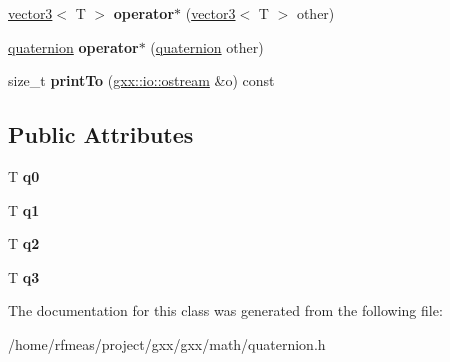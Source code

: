 \begin{DoxyCompactItemize}
\item 
\hyperlink{structmalgo_1_1vector3}{vector3}$<$ T $>$ {\bfseries operator$\ast$} (\hyperlink{structmalgo_1_1vector3}{vector3}$<$ T $>$ other)\hypertarget{classmalgo_1_1quaternion_ae8b0a1cc59760b468b5171b75cb685a4}{}\label{classmalgo_1_1quaternion_ae8b0a1cc59760b468b5171b75cb685a4}

\item 
\hyperlink{classmalgo_1_1quaternion}{quaternion} {\bfseries operator$\ast$} (\hyperlink{classmalgo_1_1quaternion}{quaternion} other)\hypertarget{classmalgo_1_1quaternion_aa78f115e5b771807299addb4657c0240}{}\label{classmalgo_1_1quaternion_aa78f115e5b771807299addb4657c0240}

\item 
size\+\_\+t {\bfseries print\+To} (\hyperlink{classgxx_1_1io_1_1ostream}{gxx\+::io\+::ostream} \&o) const \hypertarget{classmalgo_1_1quaternion_adafd686e46cd5c22d7778104fed7992d}{}\label{classmalgo_1_1quaternion_adafd686e46cd5c22d7778104fed7992d}

\end{DoxyCompactItemize}
\subsection*{Public Attributes}
\begin{DoxyCompactItemize}
\item 
T {\bfseries q0}\hypertarget{classmalgo_1_1quaternion_acc1d88a72d47b816149f1b54ab8c4889}{}\label{classmalgo_1_1quaternion_acc1d88a72d47b816149f1b54ab8c4889}

\item 
T {\bfseries q1}\hypertarget{classmalgo_1_1quaternion_abe1e014de94a7ad1f8e243a9a76b1c0c}{}\label{classmalgo_1_1quaternion_abe1e014de94a7ad1f8e243a9a76b1c0c}

\item 
T {\bfseries q2}\hypertarget{classmalgo_1_1quaternion_acef115adeeac535a3d1884e3d2604c0a}{}\label{classmalgo_1_1quaternion_acef115adeeac535a3d1884e3d2604c0a}

\item 
T {\bfseries q3}\hypertarget{classmalgo_1_1quaternion_adda1c6bcae1e35dcbac62e4bb93adfdf}{}\label{classmalgo_1_1quaternion_adda1c6bcae1e35dcbac62e4bb93adfdf}

\end{DoxyCompactItemize}


The documentation for this class was generated from the following file\+:\begin{DoxyCompactItemize}
\item 
/home/rfmeas/project/gxx/gxx/math/quaternion.\+h\end{DoxyCompactItemize}
